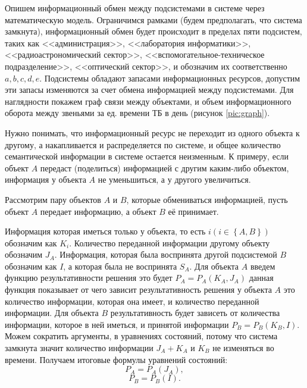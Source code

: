 Опишем информационный обмен между подсистемами в системе через математическую модель. Ограничимся рамками (будем предполагать, что система замкнута), информационный обмен будет  происходит в пределах пяти подсистем, таких как <<администрация>>, <<лаборатория информатики>>, <<радиоастрономический сектор>>, <<вспомогательное-техническое подразделение>>, <<оптический сектор>>, и обозначим их соответственно $a, b, c, d, e$. Подсистемы обладают запасами информационных ресурсов, допустим эти запасы изменяются за счет обмена информацией между подсистемами. Для наглядности покажем граф связи между объектами, и объем информационного оборота между звеньями за ед. времени ТБ в день (рисунок \ref{pic:graph}).




Нужно понимать, что информационный ресурс не переходит из одного объекта к другому, а накапливается и распределяется по системе, и общее количество семантической информации в системе остается неизменным. К примеру, если объект $A$ передаст (поделиться) информацией с другим каким-либо объектом, информация у объекта $A$ не уменьшиться, а у другого увеличиться.

Рассмотрим пару объектов $A$ и $B$, которые обмениваться информацией, пусть объект $A$ передает информацию, а объект $B$ её принимает.

Информация которая иметься только у объекта, то есть  $i \left( i \in \left\{A,B \right\} \right)$ обозначим как $K_i$. Количество переданной информации другому объекту обозначим $J_A$. Информация, которая была воспринята другой подсистемой $B$ обозначим как $I$, а которая была не воспринята $S_A$. Для объекта $A$ введем функцию результативности решения это будет $P_A=P_A(K_A,J_A)$ данная функция показывает от чего зависит результативность решения у объекта $A$ 	это количество информации, которая она имеет, и количество переданной информации. Для объекта $B$ результативность будет зависеть от количества информации, которое в ней иметься, и принятой информации $P_B=P_B(K_B,I)$. 
Можем сократить аргументы, в уравнениях состояний, потому что система замкнута значит количество информации $J_A+K_A$ и $K_B$ не изменяться во времени. Получаем итоговые формулы уравнений состояний:
\begin{equation}\label{eq:sost1}
P_A=P_A(J_A),
\end{equation}
\begin{equation}\label{eq:sost2}
P_B=P_B(I). 
\end{equation}

